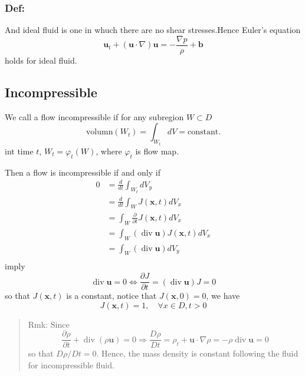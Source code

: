 \subsubsection{Def:} %

And ideal fluid is one in whuch there are no shear stresses.Hence Euler's equation 
\begin{equation}
\textbf{u}_t  + (\textbf{u}\cdot \nabla)\textbf{u} = -\frac{\nabla p}{\rho} + \textbf{b}
\end{equation}
holds for ideal fluid.

\subsection{Incompressible} %

We call a flow incompressible if for any subregion $W \subset D $
\begin{equation}
\text{volumn}(W_t) = \int_{W_t} dV = \text{constant.}
\end{equation}
int time $t$, $W_t = \varphi_t(W)$, where $\varphi_t$ is flow map.

Then a flow is incompressible if and only if
\begin{equation}
\begin{aligned}
0 &= \frac{d}{dt}\int_{W_t} dV_y\\
&= \frac{d}{dt} \int_{W} J(\textbf{x},t) dV_x\\
&= \int_{W} \frac{\partial}{\partial t} J(\textbf{x},t) dV_x\\
&= \int_{W} (\operatorname{div}\textbf{u})J(\textbf{x},t) dV_x\\
&= \int_{W} (\operatorname{div}\textbf{u})dV_y\\
\end{aligned}
\end{equation}
imply 
\begin{equation}
\operatorname{div}\textbf{u} = 0
\Leftrightarrow
\frac{\partial J}{\partial t} = (\operatorname{div}\textbf{u}) J = 0
\end{equation}
so that $J(\textbf{x},t)$ is a constant, notice that $J(\textbf{x},0) = 0$, we have
\begin{equation}
J(\textbf{x},t) = 1,\quad \forall x\in D, t>0
\end{equation}


\begin{quote}
	Rmk:
Since
\begin{equation}
\frac{\partial \rho}{\partial t} + \operatorname{div}(\rho \textbf{u}) = 0 \Rightarrow \frac{D\rho}{Dt} = \rho_t + \textbf{u}\cdot \nabla \rho = -\rho \operatorname{div}\textbf{u} = 0
\end{equation}
so that $D\rho/Dt = 0$. Hence, the mass density is constant following the fluid for incompressible fluid.
\end{quote}

